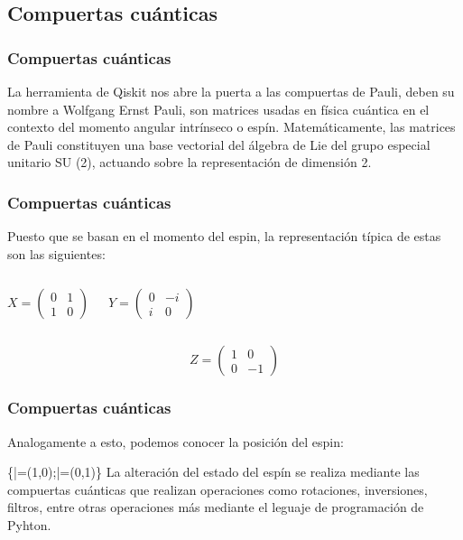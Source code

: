 \documentclass[spanish]{beamer}
\begin{document}
\newpage\subsection{Compuertas cuánticas}\justify
\begin{frame}
\frametitle{Compuertas cuánticas}
La herramienta de Qiskit nos abre la puerta a las compuertas de Pauli, deben su nombre a Wolfgang Ernst Pauli, son matrices usadas en física cuántica en el contexto del momento angular intrínseco o espín. Matemáticamente, las matrices de Pauli constituyen una base vectorial del álgebra de Lie del grupo especial unitario SU (2), actuando sobre la representación de dimensión 2.
\end{frame}

\newpage\justify
\begin{frame}
\frametitle{Compuertas cuánticas}
Puesto que se basan en el momento del espin, la representación típica de estas son las siguientes:

\begin{columns}
\begin{equation}
X=\begin{pmatrix}
        0 & 1\\
        1 & 0
        \end{pmatrix}
    \end{equation}
    
\begin{equation}
Y=\begin{pmatrix}
        0 & -i\\
        i & 0
        \end{pmatrix}
    \end{equation}
\end{columns}

\begin{equation}
Z=\begin{pmatrix}
        1 & 0\\
        0 & -1
        \end{pmatrix}
    \end{equation}
\end{frame}

\newpage\justify
\begin{frame}
\frametitle{Compuertas cuánticas}

Analogamente a esto, podemos conocer la posición del espin:

\centering\displaystyle \left\{|\uparrow \rangle =(1,0);|\downarrow \rangle =(0,1)\right\}
\justify
La alteración del estado del espín se realiza mediante las compuertas cuánticas que realizan operaciones como rotaciones, inversiones, filtros, entre otras operaciones más mediante el leguaje de programación de Pyhton.
\end{frame}
\end{document}
